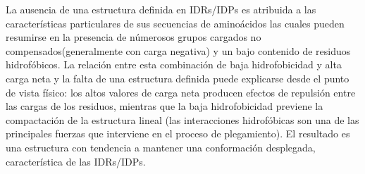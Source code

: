 La ausencia de una estructura definida en IDRs/IDPs es atribuida a las características particulares de sus secuencias de aminoácidos las cuales pueden resumirse en la presencia de númerosos 
grupos cargados no compensados(generalmente con carga negativa) y un bajo contenido de residuos hidrofóbicos.
La relación entre esta combinación de baja hidrofobicidad y alta carga neta y la falta de una estructura definida puede explicarse desde el punto de vista físico:
los altos valores de carga neta producen efectos de repulsión entre las cargas de los residuos, mientras que la baja hidrofobicidad previene la compactación de la estructura lineal
(las interacciones hidrofóbicas son una de las principales fuerzas que interviene en el proceso de plegamiento).
El resultado es una estructura con tendencia a mantener una conformación desplegada, característica de las IDRs/IDPs.


% 
% 
% 



